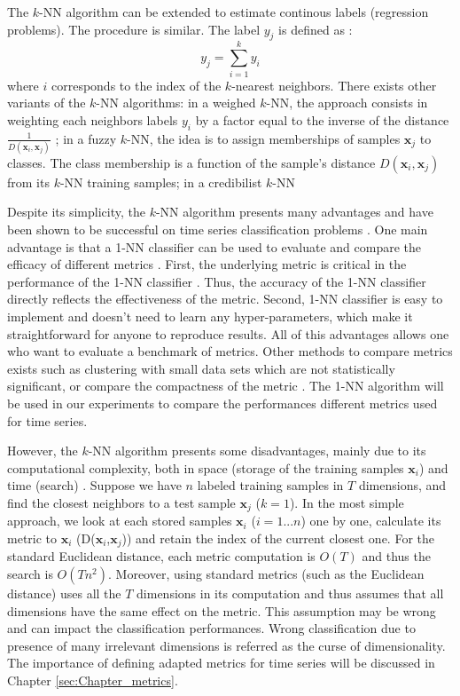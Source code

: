 The $k$-NN algorithm can be extended to estimate continous labels (regression problems). The procedure is similar. The label $y_j$ is defined as :
\begin{equation}
y_j = \sum_{i=1}^{k} y_{i}
\end{equation}
where $i$ corresponds to the index of the $k$-nearest neighbors. There exists other variants of the $k$-NN algorithms: in a weighed $k$-NN, the approach consists in weighting each neighbors labels $y_{i}$ by a factor equal to the inverse of the distance $\frac{1}{D(\textbf{x}_i, \textbf{x}_j)}$ ; in a fuzzy $k$-NN, the idea is to assign memberships of samples $\textbf{x}_j$ to classes. The class membership is a function of the sample’s distance $D(\textbf{x}_i, \textbf{x}_j)$ from its $k$-NN training samples; in a credibilist $k$-NN \cite{Denoeux1995}

Despite its simplicity, the $k$-NN algorithm presents many advantages and have been shown to be successful on time series classification problems \cite{Belongie2002,Xi2006a,Ding2008}. One main advantage is that a 1-NN classifier can be used to evaluate and compare the efficacy of different metrics \cite{Ding2008}. First, the underlying metric is critical in the performance of the 1-NN classifier \cite{Tan2005b}. Thus, the accuracy of the 1-NN classifier directly reflects the effectiveness of the metric. Second, 1-NN classifier is easy to implement and doesn't need to learn any hyper-parameters, which make it straightforward for anyone to reproduce results. All of this advantages allows one who want to evaluate a benchmark of metrics. Other methods to compare metrics exists such as clustering with small data sets which are not statistically significant, or compare the compactness of the metric \cite{Morse2007,Vlachos2006}. The 1-NN algorithm will be used in our experiments to compare the performances different metrics used for time series.

However, the $k$-NN algorithm presents some disadvantages, mainly due to its computational complexity, both in space (storage of the training samples $\textbf{x}_i$) and time (search) \cite{Duda1973}. Suppose we have $n$ labeled training samples in $T$ dimensions, and find the closest neighbors to a test sample $\textbf{x}_j$ ($k = 1$). In the most simple approach, we look at each stored samples $\textbf{x}_i$ ($i=1...n$) one by one, calculate its metric to $\textbf{x}_i$ (D($\textbf{x}_i$,$\textbf{x}_j$)) and retain the index of the current closest one. For the standard Euclidean distance, each metric computation is $O(T)$ and thus the search is $O(Tn^2)$. Moreover, using standard metrics (such as the Euclidean distance) uses all the $T$ dimensions in its computation and thus assumes that all dimensions have the same effect on the metric. This assumption may be wrong and can impact the classification performances. Wrong classification due to presence of many irrelevant dimensions is referred as the curse of dimensionality. The importance of defining adapted metrics for time series will be discussed in Chapter \ref{sec:Chapter_metrics}.


